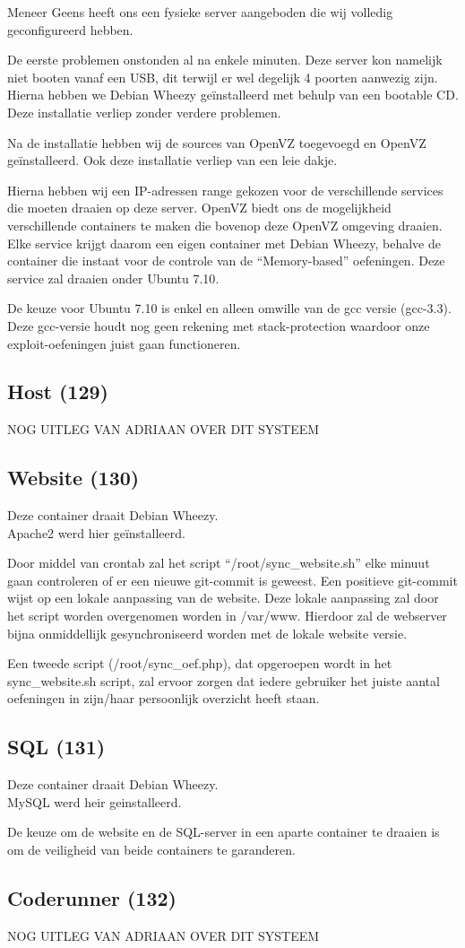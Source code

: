Meneer Geens heeft ons een fysieke server aangeboden die wij volledig geconfigureerd hebben.

De eerste problemen onstonden al na enkele minuten. Deze server kon namelijk niet booten vanaf een USB, dit terwijl er wel degelijk 4 poorten aanwezig zijn. Hierna hebben we Debian Wheezy\cite{wheezy} ge\"installeerd met behulp van een bootable CD. Deze installatie verliep zonder verdere problemen.

Na de installatie hebben wij de sources van OpenVZ\cite{openvz} toegevoegd en OpenVZ ge\"installeerd.
Ook deze installatie verliep van een leie dakje.

Hierna hebben wij een IP-adressen range gekozen voor de verschillende services die moeten draaien op deze server. OpenVZ biedt ons de mogelijkheid verschillende containers\cite{openvzcontainers} te maken die bovenop deze OpenVZ omgeving draaien. Elke service krijgt daarom een eigen container met Debian Wheezy, behalve de container die instaat voor de controle van de ``Memory-based'' oefeningen. Deze service zal draaien onder Ubuntu 7.10\cite{openvzubuntu}.

De keuze voor Ubuntu 7.10 is enkel en alleen omwille van de gcc\cite{gcc} versie (gcc-3.3). Deze gcc-versie houdt nog geen rekening met stack-protection waardoor onze exploit-oefeningen juist gaan functioneren.

\subsection{Host (129)}
NOG UITLEG VAN ADRIAAN OVER DIT SYSTEEM

\subsection{Website (130)}
Deze container draait Debian Wheezy.\\
Apache2\cite{apache} werd hier geïnstalleerd.

Door middel van crontab zal het script ``/root/sync\_website.sh'' elke minuut gaan controleren of er een nieuwe git-commit is geweest. Een positieve git-commit wijst op een lokale aanpassing van de website. Deze lokale aanpassing zal door het script worden overgenomen worden in /var/www. Hierdoor zal de webserver bijna onmiddellijk gesynchroniseerd worden met de lokale website versie.

Een tweede script (/root/sync\_oef.php), dat opgeroepen wordt in het sync\_website.sh script, zal ervoor zorgen dat iedere gebruiker het juiste aantal oefeningen in zijn/haar persoonlijk overzicht heeft staan.
\subsection{SQL (131)}
Deze container draait Debian Wheezy.\\
MySQL werd heir geinstalleerd.

De keuze om de website en de SQL-server in een aparte container te draaien is om de veiligheid van beide containers te garanderen.
\subsection{Coderunner (132)}
NOG UITLEG VAN ADRIAAN OVER DIT SYSTEEM